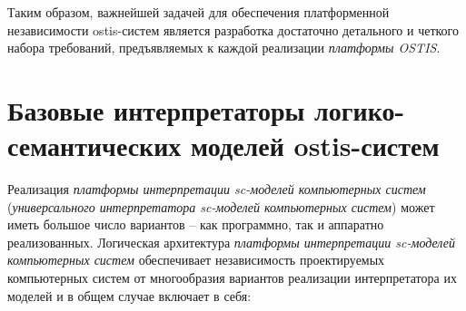 Таким образом, важнейшей задачей для обеспечения платформенной независимости ostis-систем является разработка достаточно детального и четкого набора требований, предъявляемых к каждой реализации \textit{платформы OSTIS}.

\section{Базовые интерпретаторы логико-семантических моделей ostis-систем}



\begin{SCn}
\end{SCn}

Реализация \textit{платформы интерпретации sc-моделей компьютерных систем} (\textit{универсального интерпретатора sc-моделей компьютерных систем}) может иметь большое число вариантов -- как программно, так и аппаратно реализованных. Логическая архитектура \textit{платформы интерпретации sc-моделей компьютерных систем} обеспечивает независимость проектируемых компьютерных систем от многообразия вариантов реализации интерпретатора их моделей и в общем случае включает в себя:

